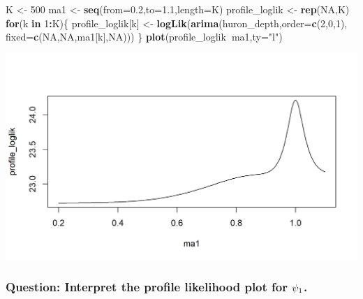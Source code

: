 \documentclass[]{article}
\newenvironment{Shaded}{\begin{snugshade}}{\end{snugshade}}
\newcommand{\KeywordTok}[1]{\textcolor[rgb]{0.13,0.29,0.53}{\textbf{#1}}}
\newcommand{\DataTypeTok}[1]{\textcolor[rgb]{0.13,0.29,0.53}{#1}}
\newcommand{\DecValTok}[1]{\textcolor[rgb]{0.00,0.00,0.81}{#1}}
\newcommand{\FloatTok}[1]{\textcolor[rgb]{0.00,0.00,0.81}{#1}}
\newcommand{\StringTok}[1]{\textcolor[rgb]{0.31,0.60,0.02}{#1}}
\newcommand{\OtherTok}[1]{\textcolor[rgb]{0.56,0.35,0.01}{#1}}
\newcommand{\ControlFlowTok}[1]{\textcolor[rgb]{0.13,0.29,0.53}{\textbf{#1}}}
\newcommand{\OperatorTok}[1]{\textcolor[rgb]{0.81,0.36,0.00}{\textbf{#1}}}
\newcommand{\NormalTok}[1]{#1}
\begin{document}
\begin{Shaded}
\begin{Highlighting}[]
\NormalTok{K <-}\StringTok{ }\DecValTok{500}
\NormalTok{ma1 <-}\StringTok{ }\KeywordTok{seq}\NormalTok{(}\DataTypeTok{from=}\FloatTok{0.2}\NormalTok{,}\DataTypeTok{to=}\FloatTok{1.1}\NormalTok{,}\DataTypeTok{length=}\NormalTok{K)}
\NormalTok{profile_loglik <-}\StringTok{ }\KeywordTok{rep}\NormalTok{(}\OtherTok{NA}\NormalTok{,K)}
\ControlFlowTok{for}\NormalTok{(k }\ControlFlowTok{in} \DecValTok{1}\OperatorTok{:}\NormalTok{K)\{}
\NormalTok{   profile_loglik[k] <-}\StringTok{ }\KeywordTok{logLik}\NormalTok{(}\KeywordTok{arima}\NormalTok{(huron_depth,}\DataTypeTok{order=}\KeywordTok{c}\NormalTok{(}\DecValTok{2}\NormalTok{,}\DecValTok{0}\NormalTok{,}\DecValTok{1}\NormalTok{),}
      \DataTypeTok{fixed=}\KeywordTok{c}\NormalTok{(}\OtherTok{NA}\NormalTok{,}\OtherTok{NA}\NormalTok{,ma1[k],}\OtherTok{NA}\NormalTok{)))}
\NormalTok{\}}
\KeywordTok{plot}\NormalTok{(profile_loglik}\OperatorTok{~}\NormalTok{ma1,}\DataTypeTok{ty=}\StringTok{"l"}\NormalTok{)}
\end{Highlighting}
\end{Shaded}

\begin{center}\includegraphics{figure/intro-huron_profile-1} \end{center}

\subsubsection{\texorpdfstring{Question: Interpret the profile
likelihood plot for
\(\psi_1\).}{Question: Interpret the profile likelihood plot for \textbackslash{}ma\_1.}}\label{question-interpret-the-profile-likelihood-plot-for-ma_1.}
\end{document}
